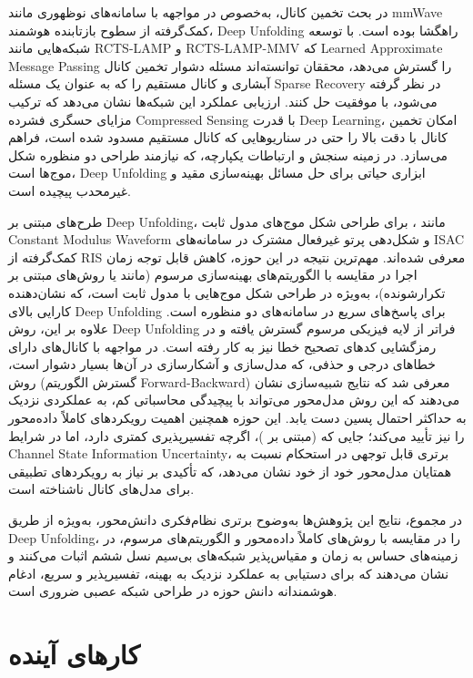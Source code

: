 در بحث تخمین کانال، به‌خصوص در مواجهه با سامانه‌های نوظهوری مانند 
\gls{mmWave}
 کمک‌گرفته از سطوح بازتابنده هوشمند، 
\gls{Deep Unfolding}
 راهگشا بوده است. با توسعه شبکه‌هایی مانند
\gls{RCTS-LAMP}
 و 
\gls{RCTS-LAMP-MMV}
 که 
\gls{Learned Approximate Message Passing}
  را گسترش می‌دهد، محققان توانسته‌اند مسئله دشوار تخمین کانال آبشاری و کانال مستقیم را که به عنوان یک مسئله
\gls{Sparse Recovery}
  در نظر گرفته می‌شود، با موفقیت حل کنند. ارزیابی عملکرد این شبکه‌ها نشان می‌دهد که ترکیب مزایای حسگری فشرده 
\gls{Compressed Sensing}
   با قدرت 
\gls{Deep Learning}،
 امکان تخمین کانال با دقت بالا را حتی در سناریوهایی که کانال مستقیم مسدود شده است، فراهم می‌سازد.
در زمینه سنجش و ارتباطات یکپارچه، که نیازمند طراحی دو منظوره شکل موج‌ها است،
\gls{Deep Unfolding}
 ابزاری حیاتی برای حل مسائل بهینه‌سازی مقید و غیرمحدب پیچیده است. 

طرح‌های مبتنی بر 
\gls{Deep Unfolding}،
  مانند 
،
 برای طراحی شکل موج‌های مدول ثابت 
\gls{Constant Modulus Waveform}
  و شکل‌دهی پرتو غیرفعال مشترک در سامانه‌های 
\gls{ISAC}
   کمک‌گرفته از 
\gls{RIS}
    معرفی شده‌اند. مهم‌ترین نتیجه در این حوزه، کاهش قابل توجه زمان اجرا در مقایسه با الگوریتم‌های بهینه‌سازی مرسوم (مانند
   یا روش‌های مبتنی بر 
    تکرارشونده)، به‌ویژه در طراحی شکل موج‌هایی با مدول ثابت است، که نشان‌دهنده کارایی بالای 
\gls{Deep Unfolding}
    برای پاسخ‌های سریع در سامانه‌های دو منظوره ‌است.
علاوه بر این، روش 
\gls{Deep Unfolding}
 فراتر از لایه فیزیکی مرسوم گسترش یافته و در رمزگشایی کدهای تصحیح خطا نیز به کار رفته است. در مواجهه با کانال‌های دارای خطا‌های درجی و حذفی، که مدل‌سازی و آشکارسازی در آن‌ها بسیار دشوار است، روش 
  (گسترش الگوریتم 
\gls{Forward-Backward})
  معرفی شد که نتایج شبیه‌سازی نشان می‌دهند که این روش مدل‌محور می‌تواند با پیچیدگی محاسباتی کم، به عملکردی نزدیک به حداکثر احتمال پسین دست یابد. این حوزه همچنین اهمیت رویکردهای کاملاً داده‌محور را نیز تأیید می‌کند؛ جایی که 
   (مبتنی بر
)،
    اگرچه تفسیرپذیری کمتری دارد، اما در شرایط 
\gls{Channel State Information Uncertainty}،
   برتری قابل توجهی در استحکام نسبت به همتایان مدل‌محور خود از خود نشان می‌دهد، که تأکیدی بر نیاز به رویکردهای تطبیقی برای مدل‌های کانال ناشناخته است.

در مجموع، نتایج این پژوهش‌ها به‌وضوح برتری نظام‌فکری دانش‌محور، به‌ویژه از طریق 
\gls{Deep Unfolding}،
 را در مقایسه با روش‌های کاملاً داده‌محور و الگوریتم‌های مرسوم، در زمینه‌های حساس به زمان و مقیاس‌پذیر شبکه‌های بی‌سیم نسل ششم اثبات می‌کنند و نشان می‌دهند که برای دستیابی به عملکرد نزدیک به بهینه، تفسیرپذیر و سریع، ادغام هوشمندانه دانش حوزه در طراحی شبکه عصبی ضروری است.
\section{کارهای آینده}
\label{sec:futurework}